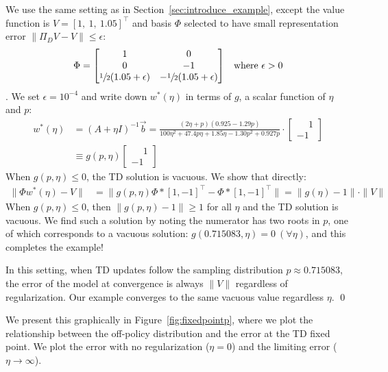 \proof We use the same setting as in Section~\ref{sec:introduce_example}, except the value function is $V = [1,~1,~1.05]^\top$ and basis $\Phi$ selected to have small representation error $\|\Pi_D V - V\| \leq \epsilon$:
\begin{align}
	\Phi & = \begin{bmatrix}
		         1                              & 0                               \\
		         0                              & -1                              \\
		         \sfrac{1}{2} (1.05 + \epsilon) & -\sfrac{1}{2} (1.05 + \epsilon) \\
	         \end{bmatrix} & \text{where $\epsilon > 0$}
\end{align}.
We set $\epsilon = 10^{-4}$ and write down $w^*(\eta)$ in terms of $g$, a scalar function of $\eta$ and $p$:
\begin{align}
	w^*(\eta) & = (A+\eta I)^{-1} \vec b =
	\frac{(2\eta + p)(0.925 - 1.29p)}{100\eta^2+47.4p\eta +1.85\eta - 1.30p^2 + 0.927p}
	\cdot \begin{bmatrix} \phantom{-}1 \\ -1 \end{bmatrix}
	\\ & \equiv g(p,\eta) \begin{bmatrix} \phantom{-}1 \\ -1 \end{bmatrix} \label{eqn:wstarrr2}
\end{align}
When $g(p,\eta) \leq 0$, the TD solution is vacuous. We show that directly:
\begin{align}
	\|\Phi w^*(\eta) - V\| & =
	\|g(p,\eta) \Phi*[1, -1]^\top - \Phi*[1, -1]^\top\|
	= \|g(\eta) - 1\|\cdot\|V\|
\end{align}
When $g(p,\eta) \leq 0$, then $\|g(p,\eta) - 1\| \geq 1$ for all $\eta$ and the TD solution is vacuous. We find such a solution by noting the numerator has two roots in $p$, one of which corresponds to a vacuous solution:
$g(0.715083, \eta) = 0~(\forall \eta)$, and this completes the example!

In this setting, when TD updates follow the sampling distribution $p\approx0.715083$, the error of the model at convergence is always $\|V\|$ regardless of regularization. Our example converges to the same vacuous value regardless $\eta$. \qed

We present this graphically in Figure~\ref{fig:fixedpointp}, where we plot the relationship between the off-policy distribution and the error at the TD fixed point. We plot the error with no regularization ($\eta=0$) and the limiting error ($\eta\to\infty$).

